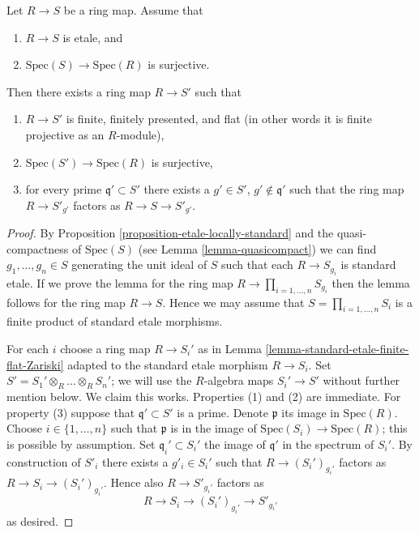 \begin{lemma}
\label{lemma-etale-finite-flat-zariski}
Let $R \to S$ be a ring map.
Assume that
\begin{enumerate}
\item $R \to S$ is etale, and
\item $\text{Spec}(S) \to \text{Spec}(R)$ is surjective.
\end{enumerate}
Then there exists a ring map $R \to S'$ such that
\begin{enumerate}
\item $R \to S'$ is finite, finitely presented, and flat
(in other words it is finite projective as an $R$-module),
\item $\text{Spec}(S') \to \text{Spec}(R)$ is surjective,
\item for every prime $\mathfrak q' \subset S'$ there exists a
$g' \in S'$, $g' \not \in \mathfrak q'$ such that
the ring map $R \to S'_{g'}$ factors as $R \to S \to S'_{g'}$.
\end{enumerate}
\end{lemma}

\begin{proof}
By Proposition \ref{proposition-etale-locally-standard} and
the quasi-compactness of $\text{Spec}(S)$ (see Lemma \ref{lemma-quasicompact})
we can find $g_1, \ldots, g_n \in S$ generating the unit ideal
of $S$ such that each $R \to S_{g_i}$ is standard etale.
If we prove the lemma for the ring map $R \to \prod_{i = 1, \ldots, n} S_{g_i}$
then the lemma follows for the ring map $R \to S$.
Hence we may assume that $S = \prod_{i = 1, \ldots, n} S_i$
is a finite product of standard etale morphisms.

\medskip\noindent
For each $i$ choose a ring map $R \to S_i'$ as in
Lemma \ref{lemma-standard-etale-finite-flat-Zariski}
adapted to the standard etale morphism $R \to S_i$.
Set $S' = S_1' \otimes_R \ldots \otimes_R S_n'$; we will use
the $R$-algebra maps $S_i' \to S'$ without further mention below.
We claim this works. Properties (1) and (2) are immediate.
For property (3) suppose that $\mathfrak q' \subset S'$ is a prime.
Denote $\mathfrak p$ its image in $\text{Spec}(R)$.
Choose $i \in \{1, \ldots, n\}$ such that $\mathfrak p$
is in the image of $\text{Spec}(S_i) \to \text{Spec}(R)$; this is
possible by assumption. Set $\mathfrak q_i' \subset S_i'$
the image of $\mathfrak q'$ in the spectrum of $S_i'$.
By construction of $S'_i$ there exists a $g'_i \in S_i'$
such that $R \to (S_i')_{g_i'}$ factors as
$R \to S_i \to (S_i')_{g_i'}$. Hence also
$R \to S'_{g_i'}$ factors as
$$
R \to S_i \to (S_i')_{g_i'} \to S'_{g_i'}
$$
as desired.
\end{proof}

